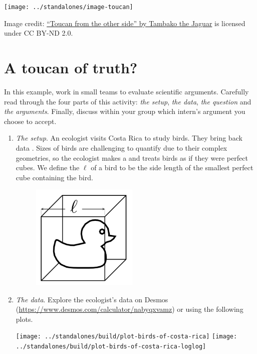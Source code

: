 \documentclass[../main.tex]{subfiles}
\begin{document}
 

\centerline{\texttt{[image: ../standalones/image-toucan]}}

{\footnotesize Image credit: \href{https://www.flickr.com/photos/8070463@N03/9324653982}{``Toucan from the other side'' by Tambako the Jaguar} is licensed under CC BY-ND 2.0.}

\section{A toucan of truth?}
\begin{example} \label{ex:toucan}
  In this example, work in small teams to evaluate scientific arguments. Carefully read through the four parts of this activity: \emph{the setup}, \emph{the data}, \emph{the question} and \emph{the arguments}. Finally, discuss within your group which intern's argument you choose to accept.

  \begin{enumerate}[wide, label=(\arabic*)]
    \item \emph{The setup}. An ecologist visits Costa Rica to study birds. They bring back data . 
      Sizes of birds are challenging to quantify due to their complex geometries, so the ecologist makes a  and treats birds as if they were perfect cubes. We define the  \(\ell\) of a bird to be the side length of the smallest perfect cube containing the bird.

      \begin{figure}[H]
        \centering
        \includegraphics[width=2in]{../standalones/image-bird-cube.png}
      \end{figure}

    \item \emph{The data}. Explore the ecologist's data on Desmos (\url{https://www.desmos.com/calculator/nabyqxvamz}) or using the following plots.

      \begin{center}
        \texttt{[image: ../standalones/build/plot-birds-of-costa-rica]}
        \quad
        \texttt{[image: ../standalones/build/plot-birds-of-costa-rica-loglog]}
      \end{center}


\end{enumerate}
\end{example}
\end{document}
